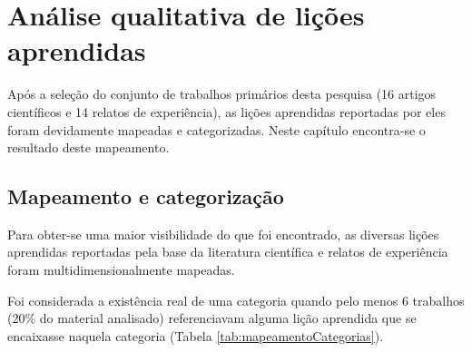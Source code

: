 \chapter{Análise qualitativa de lições aprendidas}

Após a seleção do conjunto de trabalhos primários desta pesquisa (16 artigos científicos e 14 relatos de experiência), as lições aprendidas reportadas por eles foram devidamente mapeadas e categorizadas. Neste capítulo encontra-se o resultado deste mapeamento.

\section{Mapeamento e categorização}
Para obter-se uma maior visibilidade do que foi encontrado, as diversas lições aprendidas reportadas pela base da literatura científica e relatos de experiência foram multidimensionalmente mapeadas.

Foi considerada a existência real de uma categoria quando pelo menos 6 trabalhos (20\% do material analisado) referenciavam alguma lição aprendida que se encaixasse naquela categoria (Tabela \ref{tab:mapeamentoCategorias}).


